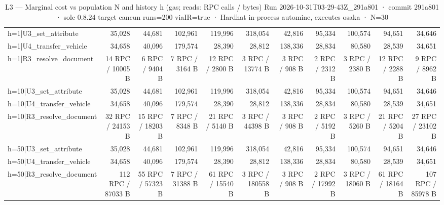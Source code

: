 \begin{table}[ht]
\begin{tabular}{lrrrrrrrrrr}
h=1|U3\_set\_attribute & 35,028 & 44,681 & 102,961 & 119,996 & 318,054 & 42,816 & 95,334 & 100,574 & 94,651 & 34,646 \\
h=1|U4\_transfer\_vehicle & 34,658 & 40,096 & 179,574 & 28,390 & 28,812 & 138,336 & 28,834 & 80,580 & 28,539 & 34,651 \\
h=1|R3\_resolve\_document & 14 RPC / 10005 B & 6 RPC / 9404 B & 7 RPC / 3164 B & 12 RPC / 2800 B & 3 RPC / 13774 B & 3 RPC / 908 B & 2 RPC / 2312 B & 3 RPC / 2380 B & 12 RPC / 2288 B & 9 RPC / 8962 B \\
h=10|U3\_set\_attribute & 35,028 & 44,681 & 102,961 & 119,996 & 318,054 & 42,816 & 95,334 & 100,574 & 94,651 & 34,646 \\
h=10|U4\_transfer\_vehicle & 34,658 & 40,096 & 179,574 & 28,390 & 28,812 & 138,336 & 28,834 & 80,580 & 28,539 & 34,651 \\
h=10|R3\_resolve\_document & 32 RPC / 24153 B & 15 RPC / 18203 B & 7 RPC / 8348 B & 21 RPC / 5140 B & 3 RPC / 44398 B & 3 RPC / 908 B & 2 RPC / 5192 B & 3 RPC / 5260 B & 21 RPC / 5204 B & 27 RPC / 23102 B \\
h=50|U3\_set\_attribute & 35,028 & 44,681 & 102,961 & 119,996 & 318,054 & 42,816 & 95,334 & 100,574 & 94,651 & 34,646 \\
h=50|U4\_transfer\_vehicle & 34,658 & 40,096 & 179,574 & 28,390 & 28,812 & 138,336 & 28,834 & 80,580 & 28,539 & 34,651 \\
h=50|R3\_resolve\_document & 112 RPC / 87033 B & 55 RPC / 57323 B & 7 RPC / 31388 B & 61 RPC / 15540 B & 3 RPC / 180558 B & 3 RPC / 908 B & 2 RPC / 17992 B & 3 RPC / 18060 B & 61 RPC / 18164 B & 107 RPC / 85978 B \\
\bottomrule
\end{tabular}
\caption{L3 — Marginal cost vs population N and history h (gas; reads: RPC calls / bytes) Run 2026-10-31T03-29-43Z\_291a801 · commit 291a801 · solc 0.8.24 target cancun runs=200 viaIR=true · Hardhat in-process automine, executes osaka · N=30}
\label{tab:scale}
\end{table}
